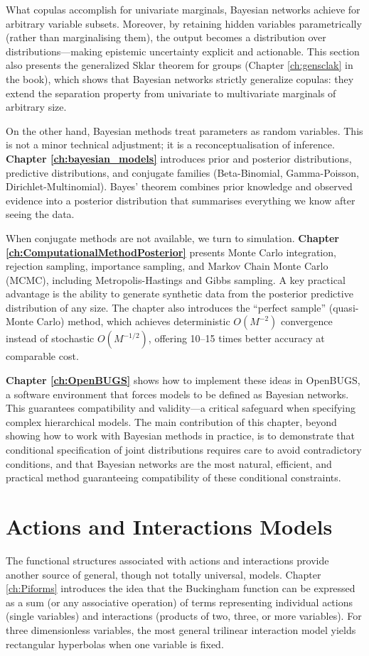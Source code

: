 What copulas accomplish for univariate marginals, Bayesian networks achieve for arbitrary variable subsets. Moreover, by retaining hidden variables parametrically (rather than marginalising them), the output becomes a distribution over distributions—making epistemic uncertainty explicit and actionable. This section also presents the generalized Sklar theorem for groups (Chapter \ref{ch:gensclak} in the book), which shows that Bayesian networks strictly generalize copulas: they extend the separation property from univariate to multivariate marginals of arbitrary size.

On the other hand, Bayesian methods treat parameters as random variables. This is not a minor technical adjustment; it is a reconceptualisation of inference. \textbf{Chapter \ref{ch:bayesian_models}} introduces prior and posterior distributions, predictive distributions, and conjugate families (Beta-Binomial, Gamma-Poisson, Dirichlet-Multinomial). Bayes' theorem combines prior knowledge and observed evidence into a posterior distribution that summarises everything we know after seeing the data.

When conjugate methods are not available, we turn to simulation. \textbf{Chapter \ref{ch:ComputationalMethodPosterior}} presents Monte Carlo integration, rejection sampling, importance sampling, and Markov Chain Monte Carlo (MCMC), including Metropolis-Hastings and Gibbs sampling. A key practical advantage is the ability to generate synthetic data from the posterior predictive distribution of any size. The chapter also introduces the “perfect sample” (quasi-Monte Carlo) method, which achieves deterministic \(O(M^{-2})\) convergence instead of stochastic \(O(M^{-1/2})\), offering 10–15 times better accuracy at comparable cost.

\textbf{Chapter \ref{ch:OpenBUGS}} shows how to implement these ideas in OpenBUGS, a software environment that forces models to be defined as Bayesian networks. This guarantees compatibility and validity—a critical safeguard when specifying complex hierarchical models. The main contribution of this chapter, beyond showing how to work with Bayesian methods in practice, is to demonstrate that conditional specification of joint distributions requires care to avoid contradictory conditions, and that Bayesian networks are the most natural, efficient, and practical method guaranteeing compatibility of these conditional constraints.

\section{Actions and Interactions Models}
The functional structures associated with actions and interactions provide another source of general, though not totally universal, models. Chapter \ref{ch:Piforms} introduces the idea that the Buckingham function can be expressed as a sum (or any associative operation) of terms representing individual actions (single variables) and interactions (products of two, three, or more variables). For three dimensionless variables, the most general trilinear interaction model yields rectangular hyperbolas when one variable is fixed.

